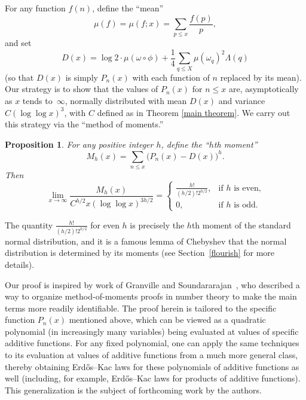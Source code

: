 \documentclass[12pt,reqno]{amsart}
\newtheorem{prop}[theorem]{Proposition}
\theoremstyle{definition}
\begin{document}
For any function $f(n)$, define the ``mean''
\begin{equation}  \label{mu definition}
\mu(f) = \mu(f;x) = \sum_{p \leq x} \frac{f(p)}{p},
\end{equation}
and set
\begin{equation}  \label{Dx definition}
D(x) = \log 2 \cdot \mu(\omega \circ \phi) + \frac{1}{4} \sum_{q \leq X} \mu(\omega_q)^2 \Lambda(q)
\end{equation}
(so that $D(x)$ is simply $P_n(x)$ with each function of $n$ replaced by its mean).
Our strategy is to show that the values of $P_n(x)$ for $n \leq x$ are, asymptotically as $x$ tends to~$\infty$, normally distributed with mean $D(x)$ and variance $C(\log\log x)^{3}$, with $C$ defined as in Theorem \ref{main theorem}. We carry out this strategy via the ``method of moments.''

\begin{prop}\label{moment asymptotics}
For any positive integer $h$, define the ``$h$th moment''
\begin{equation}  \label{Mh def}
M_h(x) = \sum_{n \leq x} \big( P_n(x) - D(x) \big)^h.
\end{equation}
Then
\[
\lim_{x \to \infty} \frac{M_h(x)}{C^{h/2}x(\log\log x)^{3h/2}} = \begin{cases} \frac{h!}{(h/2)!2^{h/2}}, &\mbox{if } h \text{ is even,} \\ 
0, & \mbox{if } h \text{ is odd.} \end{cases}
\]
\end{prop}

\noindent The quantity $\frac{h!}{(h/2)!2^{h/2}}$ for even $h$ is precisely the $h$th moment of the standard normal distribution, and it is a famous lemma of Chebyshev that the normal distribution is determined by its moments (see Section~\ref{flourish} for more details).

Our proof is inspired by work of Granville and Soundararajan~\cite{gs07}, who described a way to organize method-of-moments proofs in number theory to make the main terms more readily identifiable. The proof herein is tailored to the specific function $P_n(x)$ mentioned above, which can be viewed as a quadratic polynomial (in increasingly many variables) being evaluated at values of specific additive functions. For any fixed polynomial, one can apply the same techniques to its evaluation at values of additive functions from a much more general class, thereby obtaining Erd{\H o}s--Kac laws for these polynomials of additive functions as well (including, for example, Erd{\H o}s--Kac laws for products of additive functions). This generalization is the subject of forthcoming work by the authors.
\end{document}
